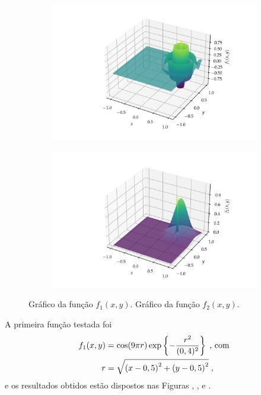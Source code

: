 \begin{figure}
  \begin{subfigure}{\textwidth}
    \centering
    \includegraphics[width=\textwidth]{imagens/graph_damped_cossine.png}
    \caption{}
    \label{fig:graph_damped_cossine}
  \end{subfigure}
  \begin{subfigure}{\textwidth}
    \centering
    \includegraphics[width=\textwidth]{imagens/graph_near_gaussians.png}
    \caption{}
    \label{fig:graph_near_gaussians}
  \end{subfigure}
  \caption{
     Gráfico da função $f_1(x,y)$.
     Gráfico da função $f_2(x,y)$.
  }
\end{figure}

A primeira função testada foi
\begin{align}
  \begin{split}    
    f_1(x,y) & = \cos(9\pi r)\exp\left\{-\frac{r^2}{(0,4)^2}\right\} \;\text{, com} \\
    r      & = \sqrt{
      \left(x - 0,5\right)^2 +
      \left(y - 0,5\right)^2
    } \;\mathrm{,}
  \end{split}
  \label{eq:func_damped_cossine}
\end{align}
e os resultados obtidos estão dispostos nas Figuras ,
,  e 
.

